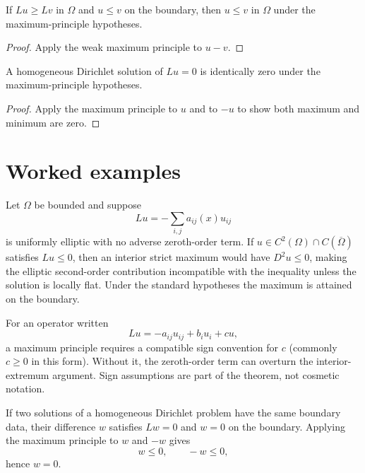 \begin{theorem}\label{thm:iii27-02}
If $Lu\ge Lv$ in $\Omega$ and $u\le v$ on the boundary, then $u\le v$ in $\Omega$ under the maximum-principle hypotheses.
\begin{proof}
Apply the weak maximum principle to $u-v$.
\end{proof}
\end{theorem}

\begin{theorem}\label{thm:iii27-03}
A homogeneous Dirichlet solution of $Lu=0$ is identically zero under the maximum-principle hypotheses.
\begin{proof}
Apply the maximum principle to $u$ and to $-u$ to show both maximum and minimum are zero.
\end{proof}
\end{theorem}

\section{Worked examples}

\begin{example}\label{ex:iii27-worked-01}
Let \(\Omega\) be bounded and suppose
\[
Lu=-\sum_{i,j}a_{ij}(x)u_{ij}
\]
is uniformly elliptic with no adverse zeroth-order term. If \(u\in C^2(\Omega)
\cap C(\overline\Omega)\) satisfies \(Lu\le0\), then an interior strict maximum
would have \(D^2u\le0\), making the elliptic second-order contribution
incompatible with the inequality unless the solution is locally flat. Under
the standard hypotheses the maximum is attained on the boundary.
\end{example}

\begin{example}\label{ex:iii27-worked-02}
For an operator written
\[
Lu=-a_{ij}u_{ij}+b_i u_i+c u,
\]
a maximum principle requires a compatible sign convention for \(c\) (commonly
\(c\ge0\) in this form). Without it, the zeroth-order term can overturn the
interior-extremum argument. Sign assumptions are part of the theorem, not
cosmetic notation.
\end{example}

\begin{example}\label{ex:iii27-worked-03}
If two solutions of a homogeneous Dirichlet problem have the same boundary
data, their difference \(w\) satisfies \(Lw=0\) and \(w=0\) on the boundary.
Applying the maximum principle to \(w\) and \(-w\) gives
\[
w\le0,\qquad -w\le0,
\]
hence \(w=0\).
\end{example}

